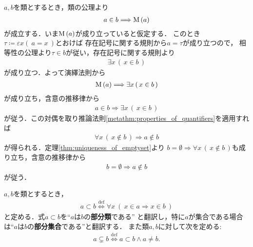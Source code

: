 	\begin{prf}
		$a,b$を類とするとき，類の公理より
		\begin{align}
			a \in b \Longrightarrow \operatorname*{M}\left(a\right)
		\end{align}
		が成立する．いま$\operatorname*{M}\left(a\right)$が成り立っていると仮定する．
		このとき$\tau \coloneqq \varepsilon x (\ a = x\ )$とおけば
		存在記号に関する規則から$a = \tau$が成り立つので，
		相等性の公理より$\tau \in b$が従い，存在記号に関する規則より
		\begin{align}
			\exists x\, (\, x \in b\, )
		\end{align}
		が成り立つ．よって演繹法則から
		\begin{align}
			\operatorname*{M}\left(a\right) \Longrightarrow \exists x\, (\, x \in b\, )
		\end{align}
		が成り立ち，含意の推移律から
		\begin{align}
			a \in b \Longrightarrow \exists x\, (\, x \in b\, )
		\end{align}
		が従う．この対偶を取り推論法則\ref{metathm:properties_of_quantifiers}を適用すれば
		\begin{align}
			\forall x\, (\, x \notin b\, ) \Longrightarrow a \notin b
		\end{align}
		が得られる．定理\ref{thm:uniqueness_of_emptyset}より
		$b = \emptyset \Longrightarrow \forall x\, (\, x \notin b\, )$も成り立ち，含意の推移律から
		\begin{align}
			b = \emptyset \Longrightarrow a \notin b
		\end{align}
		が従う．
		\QED
	\end{prf}
	
	\begin{screen}
		\begin{dfn}[部分類]
			$a,b$を類とするとき，
			\begin{align}
				a \subset b \overset{\mathrm{def}}{\Longleftrightarrow}
				\forall x\ (\ x \in a \Longrightarrow x \in b\ )
			\end{align}
			と定める．式$a \subset b$を``$a$は$b$の{\bf 部分類}である''
			と翻訳し，特に$a$が集合である場合は``$a$は$b$の{\bf 部分集合}である''と翻訳する．
			また類$a,b$に対して次を定める:
			\begin{align}
				a \subsetneq b \overset{\mathrm{def}}{\Longleftrightarrow}
				a \subset b \wedge a \neq b.
			\end{align}
		\end{dfn}
	\end{screen}
	
